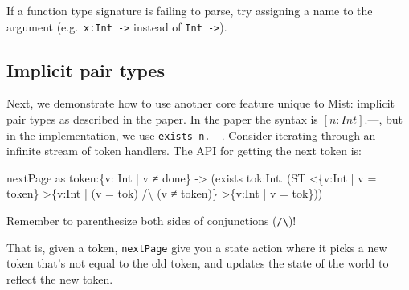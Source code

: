 \documentclass[
]{darts-v2021}
\newenvironment{Shaded}{}{}
\newcommand{\DataTypeTok}[1]{\textcolor[rgb]{0.56,0.13,0.00}{#1}}
\newcommand{\NormalTok}[1]{#1}
\newcommand{\OperatorTok}[1]{\textcolor[rgb]{0.40,0.40,0.40}{#1}}
\newcommand{\OtherTok}[1]{\textcolor[rgb]{0.00,0.44,0.13}{#1}}
\renewenvironment{quote}{\begin{myquote}}{\end{myquote}}
\begin{document}
\begin{quote}
If a function type signature is failing to parse, try assigning a name
to the argument (e.g.~\texttt{x:Int\ -\textgreater{}} instead of
\texttt{Int\ -\textgreater{}}).
\end{quote}

\hypertarget{implicit-pair-types}{%
\subsection{Implicit pair types}\label{implicit-pair-types}}

Next, we demonstrate how to use another core feature unique to Mist:
implicit pair types as described in the paper. In the paper the syntax
is \([n:Int].\text{---}\), but in the implementation, we use
\texttt{exists\ n.\ -}. Consider iterating through an infinite stream of
token handlers. The API for getting the next token is:

\begin{Shaded}
\begin{Highlighting}[numbers=left,,firstnumber=37,]
\NormalTok{nextPage as}
\NormalTok{  token}\OperatorTok{:}\NormalTok{\{v}\OperatorTok{:} \DataTypeTok{Int} \OperatorTok{|}\NormalTok{ v ≠ done\} }\OtherTok{{-}\textgreater{}}
\NormalTok{  (exists tok}\OperatorTok{:}\DataTypeTok{Int}\OperatorTok{.}
\NormalTok{    (}\DataTypeTok{ST} \OperatorTok{\textless{}}\NormalTok{\{v}\OperatorTok{:}\DataTypeTok{Int} \OperatorTok{|}\NormalTok{ v }\OtherTok{=}\NormalTok{ token\}}
        \OperatorTok{\textgreater{}}\NormalTok{\{v}\OperatorTok{:}\DataTypeTok{Int} \OperatorTok{|}\NormalTok{ (v }\OtherTok{=}\NormalTok{ tok) }\OperatorTok{/}\NormalTok{\textbackslash{} (v ≠ token)\}}
        \OperatorTok{\textgreater{}}\NormalTok{\{v}\OperatorTok{:}\DataTypeTok{Int} \OperatorTok{|}\NormalTok{ v }\OtherTok{=}\NormalTok{ tok\}))}
\end{Highlighting}
\end{Shaded}

\begin{quote}
Remember to parenthesize both sides of conjunctions
(\texttt{/\textbackslash{}})!
\end{quote}

That is, given a token, \texttt{nextPage} give you a state action where
it picks a new token that's not equal to the old token, and updates the
state of the world to reflect the new token.
\end{document}
